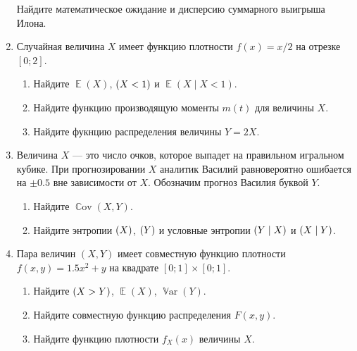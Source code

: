 \documentclass[12pt]{article}
\DeclareMathOperator{\Cov}{\mathbb{C}ov}
\DeclareMathOperator{\Var}{\mathbb{V}ar}
\let\P\relax
\DeclareMathOperator{\P}{\mathbb{P}}
\let\H\relax
\DeclareMathOperator{\H}{\mathbb{H}}
\DeclareMathOperator{\E}{\mathbb{E}}
\begin{document}
\begin{enumerate}
    Найдите математическое ожидание и дисперсию суммарного выигрыша Илона. 
    \item %
    Случайная величина $X$ имеет функцию плотности $f(x) = x/2$ на отрезке $[0;2]$. 

    \begin{enumerate}
        \item Найдите $\E(X)$, $\P(X < 1)$ и $\E(X \mid X < 1)$.
        \item Найдите функцию производящую моменты $m(t)$ для величины $X$. 
        \item Найдите фукнцию распределения величины $Y = 2X$.
    \end{enumerate}
    \item Величина $X$ — это число очков, которое выпадет на правильном игральном кубике. 
    При прогнозировании $X$ аналитик Василий равновероятно ошибается на $\pm 0.5$ вне зависимости от $X$. 
    Обозначим прогноз Василия буквой $Y$. 

    \begin{enumerate}
        \item Найдите $\Cov(X, Y)$.
        \item Найдите энтропии $\H(X)$, $\H(Y)$ и условные энтропии $\H(Y \mid X)$ и $\H(X \mid Y)$.
    \end{enumerate}
    
    
    \item %
    
    Пара величин $(X, Y)$ имеет совместную функцию плотности $f(x, y) = 1.5x^2 + y$ на квадрате $[0;1]\times[0;1]$.

    \begin{enumerate}
        \item Найдите  $\P(X > Y)$, $\E(X)$, $\Var(Y)$.
        \item Найдите совместную функцию распределения $F(x, y)$.
        \item Найдите функцию плотности $f_X(x)$ величины $X$.
    \end{enumerate}
\end{enumerate}
\end{document}
